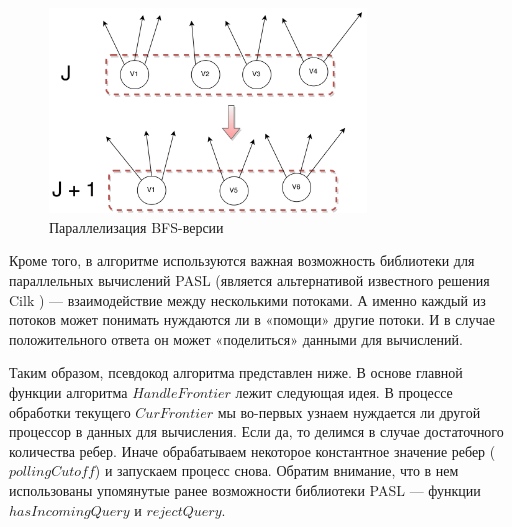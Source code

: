 \begin{figure}[h]
\centering
\includegraphics[width=0.75\textwidth]{img/bf_par_3.png}
\caption{Параллелизация BFS-версии}
\label{bf_par_3}
\end{figure}

Кроме того, в алгоритме используются важная возможность библиотеки для параллельных вычислений PASL \cite{PASL} (является альтернативой известного решения Cilk \cite{CILK}) --- взаимодействие между несколькими потоками. А именно каждый из потоков может понимать нуждаются ли в «помощи» другие потоки. И в случае положительного ответа он может «поделиться» данными для вычислений. 

Таким образом, псевдокод алгоритма представлен ниже. В основе главной функции алгоритма $HandleFrontier$ лежит следующая идея. В процессе обработки текущего $CurFrontier$ мы во-первых узнаем нуждается ли другой процессор в данных для вычисления. Если да, то делимся в случае достаточного количества ребер. Иначе обрабатываем некоторое константное значение ребер ($pollingCutoff$) и запускаем процесс снова. Обратим внимание, что в нем использованы упомянутые ранее возможности библиотеки PASL --- функции $hasIncomingQuery$ и $rejectQuery$. 



